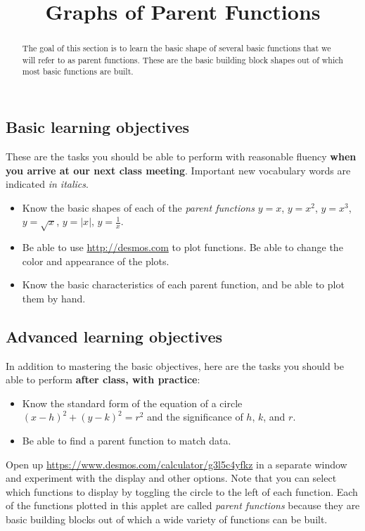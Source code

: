 \documentclass{ximera}
\title{Graphs of Parent Functions}
\begin{document}
\begin{abstract}
The goal of this section is to learn the basic shape of several basic functions that we will refer to as parent functions. These are the basic building block shapes out of which most basic functions are built.
\end{abstract}
\maketitle

\subsection*{Basic learning objectives}

These are the tasks you should be able to perform with reasonable fluency \textbf{when you arrive at our next class meeting}. Important new vocabulary words are indicated \emph{in italics}. 

\begin{itemize}
	\item Know the basic shapes of each of the \emph{parent functions} $y=x$, $y=x^2$, $y=x^3$, $y=\sqrt{x}$, $y=|x|$, $y=\frac{1}{x}$.
	\item Be able to use \url{http://desmos.com} to plot functions. Be able to change the color and appearance of the plots.
	\item Know the basic characteristics of each parent function, and be able to plot them by hand.
\end{itemize}

\subsection*{Advanced learning objectives}

In addition to mastering the basic objectives, here are the tasks you should be able to perform \textbf{after class, with practice}: 

\begin{itemize}
	\item Know the standard form of the equation of a circle $(x-h)^2+(y-k)^2=r^2$ and the significance of $h$, $k$, and $r$.
	\item Be able to find a parent function to match data.
\end{itemize}

Open up \url{https://www.desmos.com/calculator/g3l5c4yfkz} in a separate window and experiment with the display and other options. Note that you can select which functions to display by toggling the circle to the left of each function. Each of the functions plotted in this applet are called \emph{parent functions} because they are basic building blocks out of which a wide variety of functions can be built.
\end{document}
